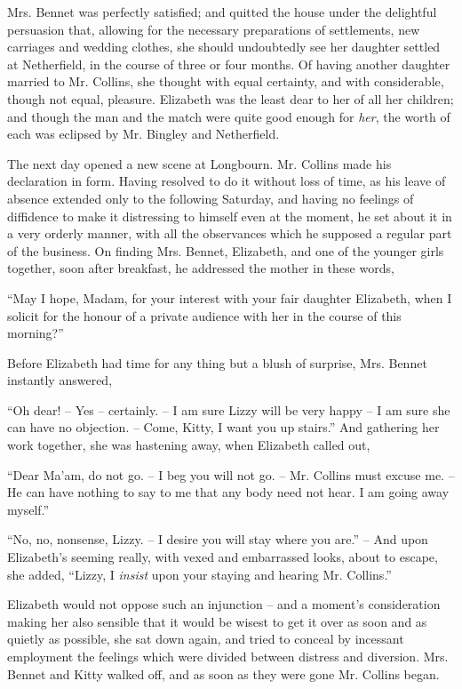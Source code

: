 Mrs. Bennet was perfectly satisfied; and quitted the
house under the delightful persuasion that, allowing for
the necessary preparations of settlements, new carriages
and wedding clothes, she should undoubtedly see her
daughter settled at Netherfield, in the course of three or
four months. Of having another daughter married to
Mr. Collins, she thought with equal certainty, and with
considerable, though not equal, pleasure. Elizabeth was
the least dear to her of all her children; and though the
man and the match were quite good enough for \textit{her},
the worth of each was eclipsed by Mr. Bingley and
Netherfield.


The next day opened a new scene at Longbourn.
Mr. Collins made his declaration in form. Having resolved
to do it without loss of time, as his leave of absence
extended only to the following Saturday, and having no
feelings of diffidence to make it distressing to himself
even at the moment, he set about it in a very orderly
manner, with all the observances which he supposed a
regular part of the business. On finding Mrs. Bennet,
Elizabeth, and one of the younger girls together, soon
after breakfast, he addressed the mother in these words,

“May I hope, Madam, for your interest with your fair
daughter Elizabeth, when I solicit for the honour of a
private audience with her in the course of this morning?”

Before Elizabeth had time for any thing but a blush
of surprise, Mrs. Bennet instantly answered,

“Oh dear! -- Yes -- certainly. -- I am sure Lizzy will be
very happy -- I am sure she can have no objection. -- Come,
Kitty, I want you up stairs.” And gathering her work
together, she was hastening away, when Elizabeth called
out,

“Dear Ma’am, do not go. -- I beg you will not go. -- Mr.
Collins must excuse me. -- He can have nothing to
say to me that any body need not hear. I am going away
myself.”

“No, no, nonsense, Lizzy. -- I desire you will stay
where you are.” -- And upon Elizabeth’s seeming really,
with vexed and embarrassed looks, about to escape, she
added, “Lizzy, I \textit{insist} upon your staying and hearing
Mr. Collins.”

Elizabeth would not oppose such an injunction -- and
a moment’s consideration making her also sensible that
it would be wisest to get it over as soon and as quietly
as possible, she sat down again, and tried to conceal by
incessant employment the feelings which were divided
between distress and diversion. Mrs. Bennet and Kitty
walked off, and as soon as they were gone Mr. Collins
began.

